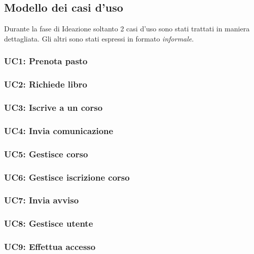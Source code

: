 \subsection{Modello dei casi d'uso}

Durante la fase di Ideazione soltanto 2 casi d'uso sono stati trattati in maniera dettagliata. Gli altri sono stati espressi in formato \textit{informale}.

\subsubsection{UC1: Prenota pasto}


\newpage

\subsubsection{UC2: Richiede libro}


\subsubsection{UC3: Iscrive a un corso}


\newpage

\subsubsection{UC4: Invia comunicazione}


\subsubsection{UC5: Gestisce corso}



\newpage

\subsubsection{UC6: Gestisce iscrizione corso}


\subsubsection{UC7: Invia avviso}


\subsubsection{UC8: Gestisce utente}


\subsubsection{UC9: Effettua accesso}
